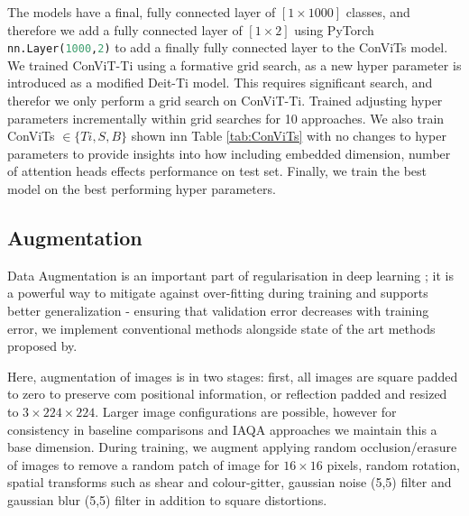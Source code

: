 The models have a final, fully connected layer of $[1 \times 1000]$ classes, and therefore we add a fully connected layer of $[1 \times 2]$ using PyTorch \lstinline[columns=fixed, language=Python]{nn.Layer(1000,2)} to add a finally fully connected layer to the ConViTs model. We trained ConViT-Ti using a formative grid search, as a new hyper parameter is introduced as a modified Deit-Ti model. This requires significant search, and therefor we only perform a grid search on ConViT-Ti. Trained adjusting hyper parameters incrementally within grid searches for 10 approaches. We also train ConViTs $\in \{Ti,S,B\}$ shown inn Table \ref{tab:ConViTs} with no changes to hyper parameters to provide insights into how including embedded dimension, number of attention heads effects performance on test set. Finally, we train the best model on the best performing hyper parameters. 

\pagebreak  

\subsection{Augmentation} 

%    

Data Augmentation is an important part of regularisation in deep learning \cite{Kukacka2017}; it is a powerful way to mitigate against over-fitting during training and supports better generalization\cite{Shorten2019} - ensuring that validation error decreases with training error, we implement conventional methods\cite{Mikolajczyk2018} alongside state of the art methods proposed by\cite{Riba2020,Buslaev2020a}. 

\par

Here, augmentation of images is in two stages: first, all images are square padded to zero to preserve com positional information, or reflection padded\cite{Buslaev2020a} and resized to $3 \times 224 \times 224$. Larger image configurations are possible, however for consistency in baseline comparisons and IAQA approaches we maintain this a base dimension.  During training, we augment applying random occlusion/erasure of images to remove a random patch of image for $16\times16$ pixels, random rotation, spatial transforms such as shear and colour-gitter, gaussian noise (5,5) filter and gaussian blur (5,5) filter in addition to square distortions. 

